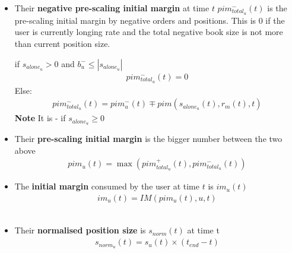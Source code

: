 \documentclass{article}%
\begin{document}
\begin{itemize}
\begin{itemize}
            if $s_{alone_u} < 0$ and $b_{u}^{+} \leq |s_{alone_u}|$
                \begin{align*}
                    pim_{total_u}^+(t) = 0
                \end{align*}
            Else:
                \begin{align*}
                    pim_{total_u}^+(t) = pim^{+}_{u}(t) \pm pim(s_{alone_u}(t), r_m(t), t)
                \end{align*}
                \textbf{Note} It is + if $s_{alone_u} \geq 0$
            \item Their \textbf{negative pre-scaling initial margin} at time $t$ $pim_{total_u}^-(t)$ is the pre-scaling initial margin by negative orders and positions. This is 0 if the user is currently longing rate and the total negative book size is not more than current position size.
            
            if $s_{alone_u} > 0$ and $b_{u}^{-} \leq |s_{alone_u}|$
                \begin{align*}
                    pim_{total_u}^-(t) = 0
                \end{align*}
            Else:
                \begin{align*}
                    pim_{total_u}^-(t) = pim^{-}_{u}(t) \mp pim(s_{alone_u}(t), r_m(t), t)
                \end{align*}
                \textbf{Note} It is - if $s_{alone_u} \geq 0$
            \item Their \textbf{pre-scaling initial margin} is the bigger number between the two above
                \begin{align*}
                    pim_{u}(t) = \max( pim_{total_u}^+(t), pim_{total_u}^-(t)) 
                \end{align*}
            
            \item The \textbf{initial margin} consumed by the user at time $t$ is $im_u(t)$
                \begin{align*}
                    im_u(t) = IM\left(pim_{u}(t), u, t \right)
                \end{align*}\
            \item Their \textbf{normalised position size} is $s_{{norm}}(t)$ at time t
                \begin{align*}
                    s_{{norm_u}}(t) = s_u(t) \times (t_{end} - t)
                \end{align*}
            

\end{itemize}
\end{itemize}
\end{document}
